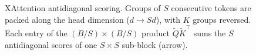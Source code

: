 \begin{figure}[h]
{
}
\caption{XAttention antidiagonal scoring. Groups of $S$ consecutive tokens are packed along the head dimension ($d \to Sd$), with $K$ groups reversed. Each entry of the $(B/S)\times(B/S)$ product $\tilde{Q}\tilde{K}^\top$ sums the $S$ antidiagonal scores of one $S\times S$ sub-block (arrow).}
\label{fig:xattention_antidiag}
\end{figure}

